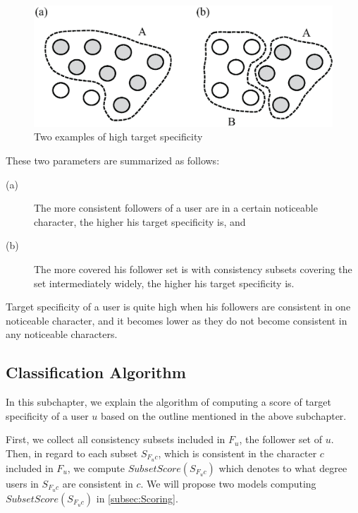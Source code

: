 {\footnotesize
\begin{figure}[t]
\begin{center}
\includegraphics[width=14cm]{images/high_consistency.eps}
 \caption{Two examples of high target specificity}
\label{fig:High Consistency}
\end{center}
\end{figure}
}

These two parameters are summarized as follows:

\begin{description}
\item[(a)] The more consistent followers of a user are in a certain
           noticeable character, the higher his target specificity
           is, and
\item[(b)] The more covered his follower set is with consistency
           subsets covering the set intermediately widely, the higher his
           target specificity is.
\end{description}

Target specificity of a user is quite high when his followers
are consistent in one noticeable character, and it becomes lower as they
do not become consistent in any noticeable characters.

\subsection{Classification Algorithm}
\label{subsec:Algorithm}

In this subchapter, we explain the algorithm of computing a score of
target specificity of a user $u$ based on the outline mentioned in the
above subchapter.

First, we collect all consistency subsets included in $F_u$, the
follower set of $u$.  Then, in regard to each subset $S_{F_uc}$, which
is consistent in
the character $c$ included in $F_u$, we compute
$\mathit{SubsetScore}(S_{F_uc})$ which denotes to what degree users in
$S_{F_uc}$ are consistent in $c$. We will propose two models
computing $\mathit{SubsetScore}(S_{F_uc})$ in \ref{subsec:Scoring}.

